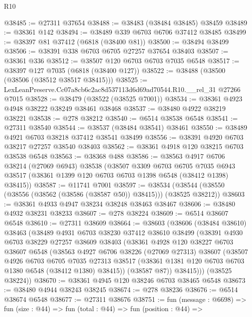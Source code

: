 \begin{lexlean}{R10}
\begin{coremodule}
@38485 := @27311 @37654
@38488 := @38483 (@38484 @38485) @38459
@38489 := @38361 @142
@38494 := @38489 @339 @6703 @6706 @37412 @38485
@38499 := @38397 @81 @37412 (@6818 (@38400 @81))
@38500 := @38494 @38499
@38506 := @38391 @338 @6703 @6705 @27257 @37654 @38403
@38507 := @38361 @336
@38512 := @38507 @120 @6703 @6703 @7035 @6548
@38517 := @38397 @127 @7035 (@6818 (@38400 @127))
@38522 := @38488 (@38500 (@38506 (@38512 @38517 @38415)))
@38525 := LexLeanPreserve.Cc07a8cb6c2ac8d537113d6d69ad70544.R10.__rel_31 @27266 @7015
@38528 := @38479 (@38522 (@38525 @7001))
@38534 := @38361 @4923 @4948 @38222 @38249 @38461 @38468
@38537 := @38480 @4922 @38219 @38221
@38538 := @278 @38212
@38540 := @6514 @38538 @6548
@38541 := @27311 @38540
@38544 := @38537 (@38484 @38541) @38461
@38550 := @38489 @4921 @6703 @38218 @37412 @38541 @38499
@38556 := @38391 @4920 @6703 @38217 @27257 @38540 @38403
@38562 := @38361 @4918 @120 @38215 @6703 @38538 @6548
@38563 := @38368 @488
@38586 := @38563
    @4917
    @6706
    @38214
    (@27069 @6943)
    @38538
    (@38507
      @3309
      @6703
      @6705
      @7035
      @6943
      @38517
      (@38361 @1399 @120 @6703 @6703 @1398 @6548 (@38412 @1398) @38415))
@38587 := @11741 @7001
@38597 := @38534 (@38544 (@38550 (@38556 (@38562 (@38586 (@38587 @50)) @38415))) (@38525 @38212))
@38603 := @38361 @4933 @4947 @38234 @38248 @38463 @38467
@38606 := @38480 @4932 @38231 @38233
@38607 := @278 @38224
@38609 := @6514 @38607 @6548
@38610 := @27311 @38609
@38664 := @38603
    (@38606
      (@38484 @38610)
      @38463
      (@38489
        @4931
        @6703
        @38230
        @37412
        @38610
        @38499
        (@38391
          @4930
          @6703
          @38229
          @27257
          @38609
          @38403
          (@38361
            @4928
            @120
            @38227
            @6703
            @38607
            @6548
            (@38563
              @4927
              @6706
              @38226
              (@27069 @27313)
              @38607
              (@38507
                @4926
                @6703
                @6705
                @7035
                @27313
                @38517
                (@38361 @1381 @120 @6703 @6703 @1380 @6548 (@38412 @1380) @38415))
              (@38587 @87))
            @38415)))
      (@38525 @38224))
@38670 := @38361 @4945 @120 @38246 @6703 @38465 @6548
@38673 := @38480 @4944 @38243 @38245
@38674 := @278 @38236
@38676 := @6514 @38674 @6548
@38677 := @27311 @38676
@38751 := fun (message : @6698) =>
  fun (size : @44) =>
  fun (total : @44) =>
  fun (position : @44) =>

\end{coremodule}
\end{lexlean}
